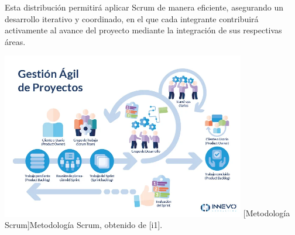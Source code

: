Esta distribución permitirá aplicar Scrum de manera eficiente, asegurando un desarrollo iterativo y coordinado, en el que cada integrante contribuirá activamente al avance del proyecto mediante la integración de sus respectivas áreas.


\begin{center}
    \includegraphics[width=0.8\textwidth]{Images/Cap 1/metoscrum.jpg}
    [Metodología Scrum]{Metodología Scrum, obtenido de [i1].}  %
\end{center}
